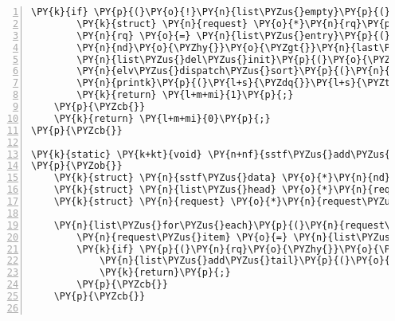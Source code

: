 \begin{Verbatim}[commandchars=\\\{\},numbers=left,firstnumber=1,stepnumber=1]
	\PY{k}{if} \PY{p}{(}\PY{o}{!}\PY{n}{list\PYZus{}empty}\PY{p}{(}\PY{o}{\PYZam{}}\PY{n}{nd}\PY{o}{\PYZhy{}}\PY{o}{\PYZgt{}}\PY{n}{queue}\PY{p}{)}\PY{p}{)} \PY{p}{\PYZob{}}
		\PY{k}{struct} \PY{n}{request} \PY{o}{*}\PY{n}{rq}\PY{p}{;}
		\PY{n}{rq} \PY{o}{=} \PY{n}{list\PYZus{}entry}\PY{p}{(}\PY{n}{nd}\PY{o}{\PYZhy{}}\PY{o}{\PYZgt{}}\PY{n}{queue}\PY{p}{.}\PY{n}{next}\PY{p}{,} \PY{k}{struct} \PY{n}{request}\PY{p}{,} \PY{n}{queuelist}\PY{p}{)}\PY{p}{;}
		\PY{n}{nd}\PY{o}{\PYZhy{}}\PY{o}{\PYZgt{}}\PY{n}{last\PYZus{}sector} \PY{o}{=} \PY{n}{rq}\PY{o}{\PYZhy{}}\PY{o}{\PYZgt{}}\PY{n}{bio}\PY{o}{\PYZhy{}}\PY{o}{\PYZgt{}}\PY{n}{bi\PYZus{}iter}\PY{p}{.}\PY{n}{bi\PYZus{}sector}\PY{p}{;}
		\PY{n}{list\PYZus{}del\PYZus{}init}\PY{p}{(}\PY{o}{\PYZam{}}\PY{n}{rq}\PY{o}{\PYZhy{}}\PY{o}{\PYZgt{}}\PY{n}{queuelist}\PY{p}{)}\PY{p}{;}
		\PY{n}{elv\PYZus{}dispatch\PYZus{}sort}\PY{p}{(}\PY{n}{q}\PY{p}{,} \PY{n}{rq}\PY{p}{)}\PY{p}{;}
		\PY{n}{printk}\PY{p}{(}\PY{l+s}{\PYZdq{}}\PY{l+s}{\PYZti{}\PYZti{}\PYZti{}\PYZti{} \PYZpc{}lu}\PY{l+s+se}{\PYZbs{}n}\PY{l+s}{\PYZdq{}}\PY{p}{,} \PY{p}{(}\PY{k+kt}{unsigned} \PY{k+kt}{long}\PY{p}{)}\PY{n}{rq}\PY{o}{\PYZhy{}}\PY{o}{\PYZgt{}}\PY{n}{bio}\PY{o}{\PYZhy{}}\PY{o}{\PYZgt{}}\PY{n}{bi\PYZus{}iter}\PY{p}{.}\PY{n}{bi\PYZus{}sector}\PY{p}{)}\PY{p}{;}
		\PY{k}{return} \PY{l+m+mi}{1}\PY{p}{;}
	\PY{p}{\PYZcb{}}
	\PY{k}{return} \PY{l+m+mi}{0}\PY{p}{;}
\PY{p}{\PYZcb{}}

\PY{k}{static} \PY{k+kt}{void} \PY{n+nf}{sstf\PYZus{}add\PYZus{}request}\PY{p}{(}\PY{k}{struct} \PY{n}{request\PYZus{}queue} \PY{o}{*}\PY{n}{q}\PY{p}{,} \PY{k}{struct} \PY{n}{request} \PY{o}{*}\PY{n}{rq}\PY{p}{)}
\PY{p}{\PYZob{}}
	\PY{k}{struct} \PY{n}{sstf\PYZus{}data} \PY{o}{*}\PY{n}{nd} \PY{o}{=} \PY{n}{q}\PY{o}{\PYZhy{}}\PY{o}{\PYZgt{}}\PY{n}{elevator}\PY{o}{\PYZhy{}}\PY{o}{\PYZgt{}}\PY{n}{elevator\PYZus{}data}\PY{p}{;}
	\PY{k}{struct} \PY{n}{list\PYZus{}head} \PY{o}{*}\PY{n}{request\PYZus{}head}\PY{p}{;}
	\PY{k}{struct} \PY{n}{request} \PY{o}{*}\PY{n}{request\PYZus{}item}\PY{p}{;}

	\PY{n}{list\PYZus{}for\PYZus{}each}\PY{p}{(}\PY{n}{request\PYZus{}head}\PY{p}{,} \PY{o}{\PYZam{}}\PY{n}{nd}\PY{o}{\PYZhy{}}\PY{o}{\PYZgt{}}\PY{n}{queue}\PY{p}{)} \PY{p}{\PYZob{}}
		\PY{n}{request\PYZus{}item} \PY{o}{=} \PY{n}{list\PYZus{}entry}\PY{p}{(}\PY{n}{request\PYZus{}head}\PY{p}{,} \PY{k}{struct} \PY{n}{request}\PY{p}{,} \PY{n}{queuelist}\PY{p}{)}\PY{p}{;}
		\PY{k}{if} \PY{p}{(}\PY{n}{rq}\PY{o}{\PYZhy{}}\PY{o}{\PYZgt{}}\PY{n}{bio}\PY{o}{\PYZhy{}}\PY{o}{\PYZgt{}}\PY{n}{bi\PYZus{}iter}\PY{p}{.}\PY{n}{bi\PYZus{}sector} \PY{o}{\PYZlt{}}\PY{o}{=} \PY{n}{abs}\PY{p}{(}\PY{n}{nd}\PY{o}{\PYZhy{}}\PY{o}{\PYZgt{}}\PY{n}{last\PYZus{}sector} \PY{o}{\PYZhy{}} \PY{n}{request\PYZus{}item}\PY{o}{\PYZhy{}}\PY{o}{\PYZgt{}}\PY{n}{bio}\PY{o}{\PYZhy{}}\PY{o}{\PYZgt{}}\PY{n}{bi\PYZus{}iter}\PY{p}{.}\PY{n}{bi\PYZus{}sector}\PY{p}{)}\PY{p}{)} \PY{p}{\PYZob{}}
			\PY{n}{list\PYZus{}add\PYZus{}tail}\PY{p}{(}\PY{o}{\PYZam{}}\PY{n}{rq}\PY{o}{\PYZhy{}}\PY{o}{\PYZgt{}}\PY{n}{queuelist}\PY{p}{,} \PY{n}{request\PYZus{}head}\PY{p}{)}\PY{p}{;}
			\PY{k}{return}\PY{p}{;}
		\PY{p}{\PYZcb{}}
	\PY{p}{\PYZcb{}}


\end{Verbatim}
